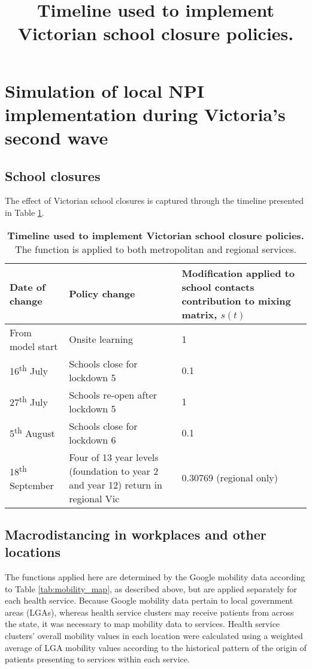 \section{Simulation of local NPI implementation during Victoria's second wave}

\subsection{School closures}
The effect of Victorian school closures is captured through the timeline presented in Table \ref{tab:school_timeline}.


\begin{table}[ht]
\renewcommand{\baselinestretch}{1}
	\begin{tabular}[ht]{| p{4.2cm} | p{6.2cm} | p{3.2cm} |}
	\hline
		Date of change & Policy change & Modification applied to school contacts contribution to mixing matrix, \(s(t)\) \\
		\hline
		From model start & Onsite learning & 1 \\
		\hline
		16\textsuperscript{th} July & Schools close for lockdown 5 & 0.1 \\
		\hline
		27\textsuperscript{th} July & Schools re-open after lockdown 5 & 1 \\
		\hline
		5\textsuperscript{th} August & Schools close for lockdown 6 & 0.1 \\
		\hline
		18\textsuperscript{th} September & Four of 13 year levels (foundation to year 2 and year 12) return in regional Vic & 0.30769 (regional only) \\
		\hline
    \end{tabular}
    \title{Timeline used to implement Victorian school closure policies.}
    \caption{\textbf{Timeline used to implement Victorian school closure policies.} The function is applied to both metropolitan and regional services.}
    \label{tab:school_timeline}
\end{table}

\subsection{Macrodistancing in workplaces and other locations}
The functions applied here are determined by the Google mobility data according to Table \ref{tab:mobility_map}, as described above, but are applied separately for each health service. Because Google mobility data pertain to local government areas (LGAs), whereas health service clusters may receive patients from across the state, it was necessary to map mobility data to services. Health service clusters' overall mobility values in each location were calculated using a weighted average of LGA mobility values according to the historical pattern of the origin of patients presenting to services within each service.

